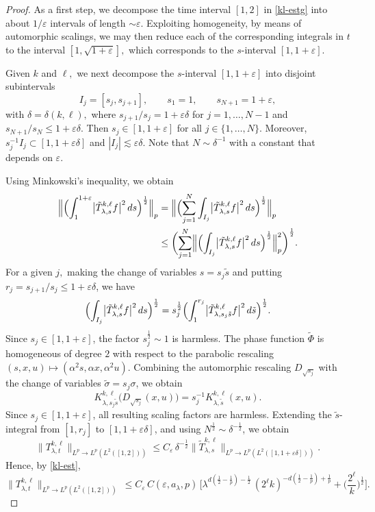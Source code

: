 \documentclass[leqno]{amsart}
\theoremstyle{definition}
\theoremstyle{remark}
\numberwithin{equation}{section}
\newcommand\la{{\lambda}}
\newcommand\ve{{\varepsilon}}
\begin{document}
\begin{proof} As a first step, we decompose the time interval $[1,2]$ in \eqref{kl-estg} into about $1/\ve$ intervals of length $\sim \ve.$ Exploiting homogeneity, by means of automorphic scalings, we may then reduce each of the corresponding integrals in $t$ to the interval $[1,\sqrt{1+\ve}],$ which corresponds to the $s$-interval $[1,1+\ve].$

Given $k$ and $\ell,$ we next decompose the $s$-interval $[1,1+\ve]$ into disjoint subintervals
\[
I_j=[s_j,s_{j+1}],\qquad s_1=1,\qquad s_{N+1}=1+\varepsilon,
\]
with $\delta=\delta(k,\ell),$ where $s_{j+1}/s_j=1+\varepsilon\delta$ for $j=1,\dots,N-1$ and $s_{N+1}/s_N\le 1+\varepsilon\delta$. Then $s_j\in[1,1+\varepsilon]$ for all $j\in\{1,\dots,N\}$. Moreover, $s_j^{-1}I_j\subset[1,1+\varepsilon\delta]$ and $|I_j|\lesssim \varepsilon\delta$. Note that $N\sim \delta^{-1}$ with a constant that depends on $\varepsilon$.

Using  Minkowski's inequality, we obtain
\begin{align*}
\Bigl\|\Bigl(\int_{1}^{1+\varepsilon}\bigl|\tilde T^{k,\ell}_{\lambda,s} f\bigr|^2\,ds\Bigr)^{\frac12}\Bigr\|_{p}
&=
\Bigl\|\Bigl(\sum_{j=1}^{N}\int_{I_j}\bigl|\tilde T^{k,\ell}_{\lambda,s} f\bigr|^2\,ds\Bigr)^{\frac12}\Bigr\|_{p}\\
&\le
\biggl(\sum_{j=1}^{N}\Bigl\|\Bigl(\int_{I_j}\bigl|\tilde T^{k,\ell}_{\lambda,s} f\bigr|^2\,ds\Bigr)^{\frac12}\Bigr\|_{p}^{2}\biggr)^{\frac12}.
\end{align*}
For a given $j,$ making the change of variables $s=s_j\tilde s$ and putting $r_j=s_{j+1}/s_j\le 1+\varepsilon\delta$, we have
\[
\Bigl(\int_{I_j}\bigl|\tilde T^{k,\ell}_{\lambda,s} f\bigr|^2\,ds\Bigr)^{\frac12}
=
s_j^{\frac12}\Bigl(\int_{1}^{r_j}\bigl|\tilde T^{k,\ell}_{\lambda,s_j\tilde s}f\bigr|^2\,d\tilde s\Bigr)^{\frac12}.
\]
Since $s_j\in[1,1+\varepsilon]$, the factor $s_j^{\frac{1}{2}}\sim 1$ is harmless. The phase function $\tilde\Phi$ is homogeneous of degree $2$ with respect to the parabolic rescaling $(s,x,u)\mapsto (\alpha^2 s,\alpha x,\alpha^2 u)$. Combining the automorphic rescaling $D_{\sqrt{s_j}}$ with the change of variables $\tilde\sigma=s_j\sigma$, we obtain
\[
K_{\lambda,s_j\tilde s}^{k,\ell}
\bigl(D_{\sqrt{s_j}}(x,u)\bigr)
=
s_j^{-1}K_{\lambda,\tilde s}^{k,\ell}(x,u).
\]
Since $s_j\in[1,1+\varepsilon]$, all resulting scaling factors are
harmless. Extending the $\tilde s$-integral from $[1,r_j]$ to
$[1,1+\varepsilon\delta]$, and using
$N^{\frac12}\sim\delta^{-\frac12}$, we obtain
\[
\|T^{k,\ell}_{\lambda,t}\|_{L^p\to L^p(L^2([1,2]))}
\le C_\ve\,
\delta^{-\frac12}
\|\tilde T^{k,\ell}_{\lambda,s}\|_
{L^p\to L^p(L^2([1,1+\varepsilon\delta]))}.
\]
Hence, by \eqref{kl-est},
\[
\|T^{k,\ell}_{\lambda,t}\|_{L^p\to L^p(L^2([1,2]))}
\ \le C_\ve \,C(\ve,a_\la,p)\, 
\Big[\lambda^{d(\frac 12 - \frac 1p )-\frac 12} \, (2^\ell k)^{-d(\frac 12 - \frac 1p ) + \frac1p } + \Big(\frac{2^{\ell}}{k}\Big)^{\frac{1}{2}}\Big].
\]


\end{proof}
\end{document}
